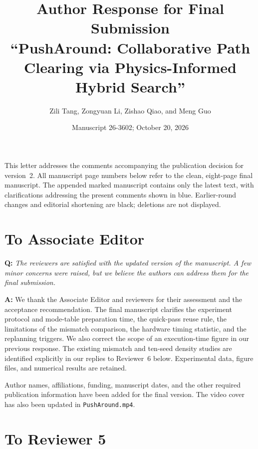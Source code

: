 \documentclass[11pt]{article}
\begin{document}
\title{Author Response for Final Submission\\
``PushAround: Collaborative Path Clearing via Physics-Informed Hybrid Search''}
\author{Zili Tang, Zongyuan Li, Zishao Qiao, and Meng Guo}
\date{Manuscript 26-3602; October 20, 2026}
\maketitle

This letter addresses the comments accompanying the publication decision for
version~2. All manuscript page numbers below refer to the clean, eight-page final
manuscript. The appended marked manuscript contains only the latest text, with
clarifications addressing the present comments shown in blue. Earlier-round
changes and editorial shortening are black; deletions are not displayed.

\section*{To Associate Editor}

\begin{shaded*}
\noindent \textbf{Q:}
{\itshape
The reviewers are satisfied with the updated version of the manuscript.
A few minor concerns were raised, but we believe the authors can
address them for the final submission.
}
\end{shaded*}

\noindent \textbf{A:}
We thank the Associate Editor and reviewers for their assessment and the
acceptance recommendation. The final manuscript clarifies the experiment
protocol and mode-table preparation time, the quick-pass reuse rule, the
limitations of the mismatch comparison, the hardware timing statistic, and the
replanning triggers. We also correct the scope of an execution-time figure in
our previous response. The existing mismatch and ten-seed density studies are
identified explicitly in our replies to Reviewer~6 below. Experimental data,
figure files, and numerical results are retained.

Author names, affiliations, funding, manuscript dates, and the other required
publication information have been added for the final version. The video cover
has also been updated in \texttt{PushAround.mp4}.

\newpage
\section*{To Reviewer 5}
\end{document}
